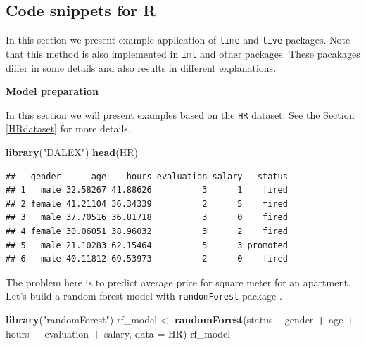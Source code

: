 \documentclass[]{krantz}
\newenvironment{Shaded}{\begin{snugshade}}{\end{snugshade}}
\newcommand{\DataTypeTok}[1]{\textcolor[rgb]{0.13,0.29,0.53}{#1}}
\newcommand{\KeywordTok}[1]{\textcolor[rgb]{0.13,0.29,0.53}{\textbf{#1}}}
\newcommand{\NormalTok}[1]{#1}
\newcommand{\OperatorTok}[1]{\textcolor[rgb]{0.81,0.36,0.00}{\textbf{#1}}}
\newcommand{\StringTok}[1]{\textcolor[rgb]{0.31,0.60,0.02}{#1}}
\theoremstyle{definition}
\theoremstyle{definition}
\theoremstyle{definition}
\theoremstyle{remark}
\begin{document}
\hypertarget{code-snippets-for-r-4}{%
\subsection{Code snippets for R}\label{code-snippets-for-r-4}}

In this section we present example application of \texttt{lime}
\citep{R-lime} and \texttt{live} \citep{R-live} packages. Note that this
method is also implemented in \texttt{iml} \citep{R-iml} and other
packages. These pacakages differ in some details and also results in
different explanations.

\textbf{Model preparation}

In this section we will present examples based on the \texttt{HR}
dataset. See the Section \ref{HRdataset} for more details.

\begin{Shaded}
\begin{Highlighting}[]
\KeywordTok{library}\NormalTok{(}\StringTok{"DALEX"}\NormalTok{)}
\KeywordTok{head}\NormalTok{(HR)}
\end{Highlighting}
\end{Shaded}

\begin{verbatim}
##   gender      age    hours evaluation salary   status
## 1   male 32.58267 41.88626          3      1    fired
## 2 female 41.21104 36.34339          2      5    fired
## 3   male 37.70516 36.81718          3      0    fired
## 4 female 30.06051 38.96032          3      2    fired
## 5   male 21.10283 62.15464          5      3 promoted
## 6   male 40.11812 69.53973          2      0    fired
\end{verbatim}

The problem here is to predict average price for square meter for an
apartment. Let's build a random forest model with \texttt{randomForest}
package \citep{R-randomForest}.

\begin{Shaded}
\begin{Highlighting}[]
\KeywordTok{library}\NormalTok{(}\StringTok{"randomForest"}\NormalTok{)}
\NormalTok{rf_model <-}\StringTok{ }\KeywordTok{randomForest}\NormalTok{(status }\OperatorTok{~}\StringTok{ }\NormalTok{gender }\OperatorTok{+}\StringTok{ }\NormalTok{age }\OperatorTok{+}\StringTok{ }\NormalTok{hours }\OperatorTok{+}\StringTok{ }\NormalTok{evaluation }\OperatorTok{+}\StringTok{ }\NormalTok{salary, }\DataTypeTok{data =}\NormalTok{ HR)}
\NormalTok{rf_model}
\end{Highlighting}
\end{Shaded}
\end{document}
